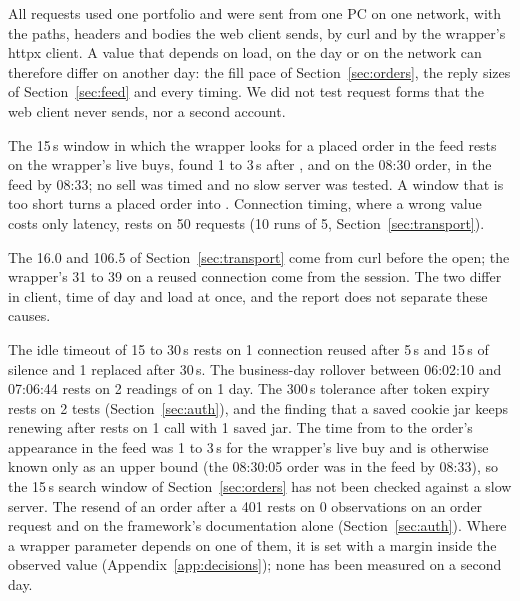 \seclabel
{}

 All requests used one portfolio and were sent from one PC on one network, with the paths, headers and bodies the web client sends, by curl and by the wrapper's httpx client. A value that depends on load, on the day or on the network can therefore differ on another day: the fill pace of Section~\ref{sec:orders}, the reply sizes of Section~\ref{sec:feed} and every timing. We did not test request forms that the web client never sends, nor a second account.

 The 15\,s window in which the wrapper looks for a placed order in the feed rests on the wrapper's live buys, found 1 to 3\,s after , and on the 08:30 order, in the feed by 08:33; no sell was timed and no slow server was tested. A window that is too short turns a placed order into . Connection timing, where a wrong value costs only latency, rests on 50 requests (10 runs of 5, Section~\ref{sec:transport}).

 The 16.0\ms{} and 106.5\ms{} of Section~\ref{sec:transport} come from curl before the open; the wrapper's 31 to 39\ms{} on a reused connection come from the session. The two differ in client, time of day and load at once, and the report does not separate these causes.

 The idle timeout of 15 to 30\,s rests on 1 connection reused after 5\,s and 15\,s of silence and 1 replaced after 30\,s. The business-day rollover between 06:02:10 and 07:06:44 rests on 2 readings of  on 1 day. The 300\,s tolerance after token expiry rests on 2 tests (Section~\ref{sec:auth}), and the finding that a saved cookie jar keeps renewing after  rests on 1 call with 1 saved jar. The time from  to the order's appearance in the feed was 1 to 3\,s for the wrapper's live buy and is otherwise known only as an upper bound (the 08:30:05 order was in the feed by 08:33), so the 15\,s search window of Section~\ref{sec:orders} has not been checked against a slow server. The resend of an order after a 401 rests on 0 observations on an order request and on the framework's documentation alone (Section~\ref{sec:auth}). Where a wrapper parameter depends on one of them, it is set with a margin inside the observed value (Appendix~\ref{app:decisions}); none has been measured on a second day.

